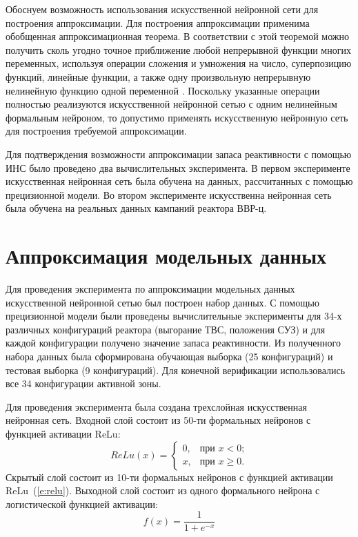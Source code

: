 Обоснуем возможность использования искусственной нейронной сети для построения аппроксимации.
Для построения аппроксимации применима обобщенная аппроксимационная теорема. В соответствии с этой теоремой можно получить сколь угодно точное приближение любой непрерывной функции многих переменных, используя операции сложения и умножения на число, суперпозицию функций, линейные функции, а также одну произвольную непрерывную нелинейную функцию одной переменной \cite{neuron-gorban}.
Поскольку указанные операции полностью реализуются искусственной нейронной сетью с одним нелинейным формальным нейроном, то допустимо применять искусственную нейронную сеть для построения требуемой аппроксимации.

Для подтверждения возможности аппроксимации запаса реактивности с
помощью ИНС было проведено два вычислительных эксперимента.
В первом эксперименте искусственная нейронная сеть была обучена на данных, рассчитанных с помощью прецизионной модели.
Во втором эксперименте искусственна нейронная сеть была обучена на реальных данных кампаний реактора ВВР-ц.

\section{Аппроксимация модельных данных}

Для проведения эксперимента по аппроксимации модельных данных искусственной нейронной сетью был построен набор данных.
С помощью прецизионной модели были проведены вычислительные эксперименты для 34-х различных конфигураций реактора (выгорание ТВС, положения СУЗ) и для каждой конфигурации получено значение запаса реактивности.
Из полученного набора данных была сформирована обучающая выборка (25 конфигураций) и тестовая выборка (9 конфигураций).
Для конечной верификации использовались все 34 конфигурации активной зоны.

Для проведения эксперимента была создана трехслойная искусственная
нейронная сеть. Входной слой состоит из 50-ти формальных нейронов с
функцией активации ReLu:
\begin{equation}
    \label{e:relu}
    ReLu(x)=
    \begin{cases}
        0, & \text{при $x<0$;} \\
        x, & \text{при $x\ge0$.}
    \end{cases}
\end{equation}
Скрытый слой состоит из 10-ти формальных нейронов с функцией активации ReLu~(\ref{e:relu}).
Выходной слой состоит из одного формального нейрона с
логистической функцией активации:
\begin{equation}
    \label{e:logist}
    f(x)=\frac{1}{1+e^{-x}}
\end{equation}

